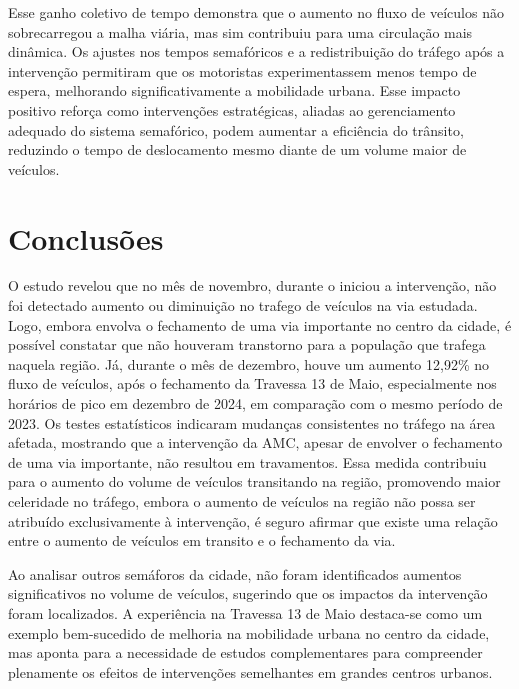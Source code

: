 Esse ganho coletivo de tempo demonstra que o aumento no fluxo de veículos não sobrecarregou a malha viária, mas sim contribuiu para uma circulação mais dinâmica. Os ajustes nos tempos semafóricos e a redistribuição do tráfego após a intervenção permitiram que os motoristas experimentassem menos tempo de espera, melhorando significativamente a mobilidade urbana. Esse impacto positivo reforça como intervenções estratégicas, aliadas ao gerenciamento adequado do sistema semafórico, podem aumentar a eficiência do trânsito, reduzindo o tempo de deslocamento mesmo diante de um volume maior de veículos.

\section{Conclusões}


O estudo revelou que no mês de novembro, durante o iniciou a intervenção, não foi detectado aumento ou diminuição no trafego de veículos na via estudada. Logo, embora envolva o fechamento de uma via importante no centro da cidade, é possível constatar que não houveram transtorno para a população que trafega naquela região. Já, durante o mês de dezembro, houve um aumento 12,92\% no fluxo de veículos, após o fechamento da Travessa 13 de Maio, especialmente nos horários de pico em dezembro de 2024, em comparação com o mesmo período de 2023. Os testes estatísticos indicaram mudanças consistentes no tráfego na área afetada, mostrando que a intervenção da AMC, apesar de envolver o fechamento de uma via importante, não resultou em travamentos. Essa medida contribuiu para o aumento do volume de veículos transitando na região, promovendo maior celeridade no tráfego, embora o aumento de veículos na região não possa ser atribuído exclusivamente à intervenção, é seguro afirmar que existe uma relação entre o aumento de veículos em transito e o fechamento da via. 

Ao analisar outros semáforos da cidade, não foram identificados aumentos significativos no volume de veículos, sugerindo que os impactos da intervenção foram localizados. A experiência na Travessa 13 de Maio destaca-se como um exemplo bem-sucedido de melhoria na mobilidade urbana no centro da cidade, mas aponta para a necessidade de estudos complementares para compreender plenamente os efeitos de intervenções semelhantes em grandes centros urbanos.